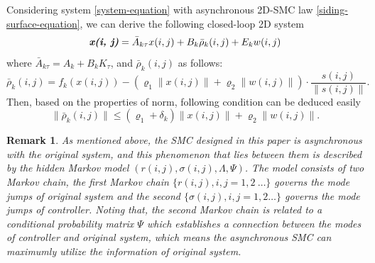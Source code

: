 \documentclass[journal,final,twocolumn]{IEEEtran}
\newtheorem{remark}{Remark}
\begin{document}
	Considering system \eqref{system-equation} with asynchronous 2D-SMC law \eqref{siding-surface-equation}, we can derive the following closed-loop 2D system 
	\begin{equation} \label{closed-loop-system-equation}
	\emph{\textbf{x(i, j)}} = \bar{A}_{k\tau }x(i,j)+B_{k}\bar{\rho}_{k}(i,j)+E_{k}w(i,j)
	\end{equation}
	where $\bar{A}_{k\tau } = A_{k}+B_{k}K_{\tau }$, and $\bar{\rho}_{k}(i,j)$ as follows:
	\begin{equation*}
	\bar\rho_{k}(i,j)=f_{k}(x(i,j))-(\varrho_{1}\|x(i,j)\|+\varrho_{2}\|w(i,j)\|)\cdot\frac{s(i,j)}{\|s(i,j)\|}.
	\end{equation*}
	Then, based on the properties of norm, following condition can be deduced easily
	\begin{equation}\label{norm-rho-inequality}
	\|\bar{\rho}_{k}(i,j)\| \leq (\varrho_{1}+\delta_{k})\|x(i,j)\| + \varrho_{2}\|w(i,j)\| .
	\end{equation} 
		
	\begin{remark}
		As mentioned above, the SMC  designed in this paper is  asynchronous with the original system, and this phenomenon that lies between them is described by the hidden Markov model $(r(i,j),\sigma(i,j),\varLambda,\varPsi)$. The model consists of two Markov chain, the first Markov chain $\{r(i,j), i,j=1,2\ \dots\}$ governs the mode jumps of original system and the second $\{ \sigma(i,j), i,j=1,2\dots \}$ governs the mode jumps of controller. Noting that, the second Markov chain is related to a conditional probability matrix $\varPsi$ which establishes a connection between the modes of controller and original system, which  means the asynchronous SMC can  maximumly  utilize the information of original system.
	\end{remark}
\end{document}
